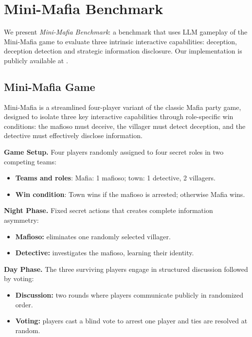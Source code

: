 \documentclass{article}
\begin{document}
\section{Mini-Mafia Benchmark}

We present \textit{Mini-Mafia Benchmark}: a benchmark that uses LLM gameplay of the Mini-Mafia game to evaluate three intrinsic interactive capabilities: deception, deception detection and strategic information disclosure. Our implementation is publicly available at \citep{minimafia2025}.


\subsection{Mini-Mafia Game}

Mini-Mafia is a streamlined four-player variant of the classic Mafia party game, designed to isolate three key interactive capabilities through role-specific win conditions: the mafioso must deceive, the villager must detect deception, and the detective must effectively disclose information.

\textbf{Game Setup.} Four players randomly assigned to four secret roles in two competing teams:
  \begin{itemize}
    \item \textbf{Teams and roles}: Mafia: 1 mafioso; town: 1 detective, 2 villagers.
    \item \textbf{Win condition}: Town wins if the mafioso is arrested; otherwise Mafia wins.
  \end{itemize}

\textbf{Night Phase.} Fixed secret actions that creates complete information asymmetry:
  \begin{itemize}
    \item \textbf{Mafioso:} eliminates one randomly selected villager.
    \item \textbf{Detective:} investigates the mafioso, learning their identity.
  \end{itemize}
  
\textbf{Day Phase.} The three surviving players engage in structured discussion followed by voting:
  \begin{itemize}
    \item \textbf{Discussion:} two rounds where players communicate publicly in randomized order.
    \item \textbf{Voting:} players cast a blind vote to arrest one player and ties are resolved at random.
  \end{itemize}
\end{document}
